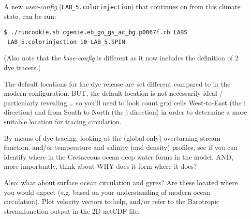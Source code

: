 A new \textit{user-config} (\texttt{LAB\_5.colorinjection}) that continues on from this climate state, can be run:
\vspace{-1mm}\begin{verbatim}
$ ./runcookie.sh cgenie.eb_go_gs_ac_bg.p0067f.rb LABS
 LAB_5.colorinjection 10 LAB_5.SPIN
\end{verbatim}\vspace{-1mm}
(Also note that the \textit{base-config} is different as it now includes the definition of 2 dye tracers.)

The default locations for the dye release are set different compared to in the modern configuration. BUT, the default location is not necessarily ideal / particularly revealing … so you’ll need to look count grid cells West-to-East (the i direction) and from South to North (the j direction) in order to determine a more suitable location for tracing circulation.

By means of dye tracing, looking at the (global only) overturning stream-function, and/or temperature and salinity (and density) profiles, see if you can identify where in the Cretaceous ocean deep water forms in the model. AND, more importantly, think about WHY does it form where it does?

Also: what about surface ocean circulation and gyres? Are these located where you would expect (e.g. based on your understanding of modern ocean circulation). Plot velocity vectors to help, and/or refer to the Barotropic streamfunction output in the 2D netCDF file.

